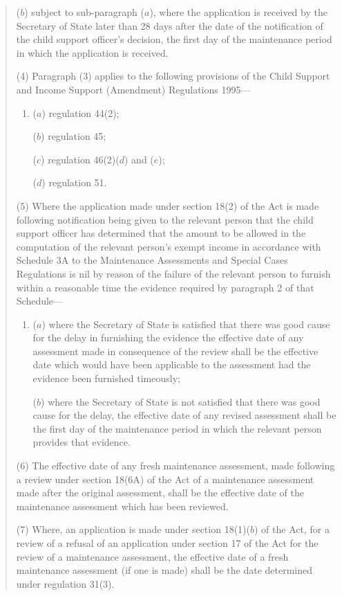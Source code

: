 \documentclass[a4paper]{article}
\begin{document}
\begin{quotation}
\begin{enumerate}
($b$) subject to sub-paragraph ($a$), where the application is received by the Secretary of State later than 28 days after the date of the notification of the child support officer’s decision, the first day of the maintenance period in which the application is received.
\end{enumerate}

(4) Paragraph (3) applies to the following provisions of the Child Support and Income Support (Amendment) Regulations 1995—
\begin{enumerate}\item[]
($a$) regulation 44(2);

($b$) regulation 45;

($c$) regulation 46(2)($d$) and ($e$);

($d$) regulation 51.
\end{enumerate}

(5) Where the application made under section 18(2) of the Act is made following notification being given to the relevant person that the child support officer has determined that the amount to be allowed in the computation of the relevant person’s exempt income in accordance with Schedule 3A to the Maintenance Assessments and Special Cases Regulations is nil by reason of the failure of the relevant person to furnish within a reasonable time the evidence required by paragraph 2 of that Schedule—
\begin{enumerate}\item[]
($a$) where the Secretary of State is satisfied that there was good cause for the delay in furnishing the evidence the effective date of any assessment made in consequence of the review shall be the effective date which would have been applicable to the assessment had the evidence been furnished timeously;

($b$) where the Secretary of State is not satisfied that there was good cause for the delay, the effective date of any revised assessment shall be the first day of the maintenance period in which the relevant person provides that evidence.
\end{enumerate}

(6) The effective date of any fresh maintenance assessment, made following a review under section 18(6A) of the Act of a maintenance assessment made after the original assessment, shall be the effective date of the maintenance assessment which has been reviewed.

(7) Where, an application is made under section 18(1)($b$) of the Act, for a review of a refusal of an application under section 17 of the Act for the review of a maintenance assessment, the effective date of a fresh maintenance assessment (if one is made) shall be the date determined under regulation 31(3).


\end{quotation}
\end{document}

